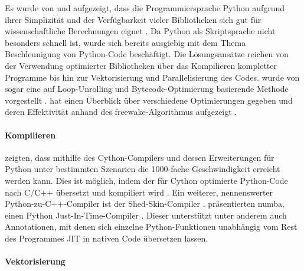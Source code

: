 Es wurde von \citeauthor{Oli07} und \citeauthor{PGH11} aufgezeigt, dass die Programmiersprache Python aufgrund ihrer Simplizität und der Verfügbarkeit vieler Bibliotheken sich gut für wissenschaftliche Berechnungen eignet \cite{Oli07,PGH11}. Da Python als Skriptsprache nicht besonders schnell ist, wurde sich bereits ausgiebig mit dem Thema Beschleunigung von Python-Code beschäftigt. Die Lösungsansätze reichen von der Verwendung optimierter Bibliotheken über das Kompilieren kompletter Programme bis hin zur Vektorisierung und Parallelisierung des Codes. \citeyear{BR09} wurde von \citeauthor{BR09} sogar eine auf Loop-Unrolling und Bytecode-Optimierung basierende Methode vorgestellt \cite{BR09}. \citeauthor{Ill14} hat \citeyear{Ill14} einen Überblick über verschiedene Optimierungen gegeben und deren Effektivität anhand des freewake-Algorithmus aufgezeigt \cite{Ill14}.

\paragraph{Kompilieren}

\citeauthor{BBC+11} zeigten, dass mithilfe des Cython-Compilers und dessen Erweiterungen für Python unter bestimmten Szenarien die 1000-fache Geschwindigkeit erreicht werden kann. Dies ist möglich, indem der für Cython optimierte Python-Code nach C/C++ übersetzt und kompiliert wird \cite{BBC+11}. Ein weiterer, nennenswerter Python-zu-C++-Compiler ist der Shed-Skin-Compiler \cite{Mar09}. \citeauthor{LPS15} präsentierten \citeyear{LPS15} numba, einen Python Just-In-Time-Compiler \cite{LPS15}. Dieser unterstützt unter anderem auch Annotationen, mit denen sich einzelne Python-Funktionen unabhängig vom Rest des Programmes \gls{JIT} in nativen Code übersetzen lassen. 

\paragraph{Vektorisierung}


